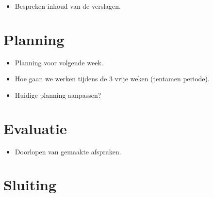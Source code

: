 \documentclass[]{article}
\begin{document}
  \begin{itemize}
    \item Bespreken inhoud van de verslagen.
  \end{itemize}

\section{Planning}
  \begin{itemize}
    \item Planning voor volgende week.
    \item Hoe gaan we werken tijdens de 3 vrije weken (tentamen periode).
    \item Huidige planning aanpassen?
  \end{itemize}

\section{Evaluatie}
  \begin{itemize}
    \item Doorlopen van gemaakte afspraken.
  \end{itemize}

\section{Sluiting}
\end{document}
